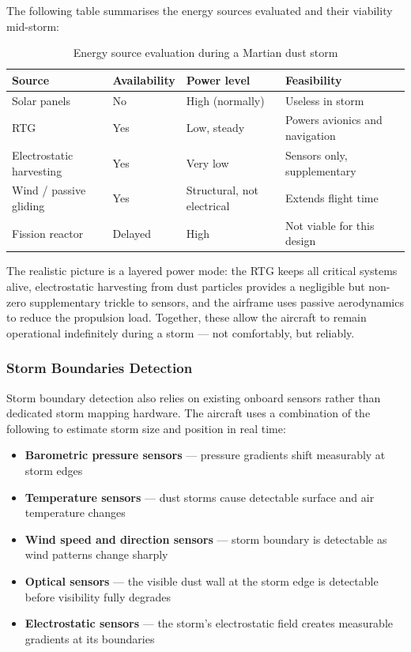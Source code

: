 \documentclass[a4paper,12pt]{article}
\begin{document}
The following table summarises the energy sources evaluated and their viability mid-storm:

\begin{table}[h]
\centering
\begin{tabular}{@{}llll@{}}
\toprule
\textbf{Source} & \textbf{Availability} & \textbf{Power level} & \textbf{Feasibility} \\
\midrule
Solar panels        & No         & High (normally)  & Useless in storm \\
RTG                 & Yes        & Low, steady      & Powers avionics and navigation \\
Electrostatic harvesting & Yes   & Very low         & Sensors only, supplementary \\
Wind / passive gliding   & Yes   & Structural, not electrical & Extends flight time \\
Fission reactor     & Delayed    & High             & Not viable for this design \\
\bottomrule
\end{tabular}
\caption{Energy source evaluation during a Martian dust storm}
\end{table}

The realistic picture is a layered power mode: the RTG keeps all critical systems alive,
electrostatic harvesting from dust particles provides a negligible but non-zero supplementary
trickle to sensors, and the airframe uses passive aerodynamics to reduce the propulsion load.
Together, these allow the aircraft to remain operational indefinitely during a storm — not
comfortably, but reliably.

\subsubsection{Storm Boundaries Detection}

Storm boundary detection also relies on existing onboard sensors rather than dedicated storm
mapping hardware. The aircraft uses a combination of the following to estimate storm size
and position in real time:

\begin{itemize}[itemsep=0.3em]
    \item \textbf{Barometric pressure sensors} — pressure gradients shift measurably at storm edges
    \item \textbf{Temperature sensors} — dust storms cause detectable surface and air temperature changes
    \item \textbf{Wind speed and direction sensors} — storm boundary is detectable as wind patterns change sharply
    \item \textbf{Optical sensors} — the visible dust wall at the storm edge is detectable before
    visibility fully degrades
    \item \textbf{Electrostatic sensors} — the storm's electrostatic field creates measurable gradients
    at its boundaries
\end{itemize}
\end{document}

